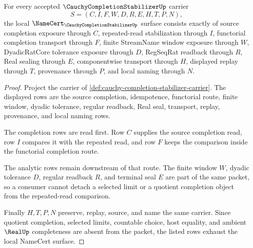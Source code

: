\begin{theorem}
\label{thm:cauchy-completion-stabilizer-namecert-obligations}
For every accepted $\CauchyCompletionStabilizerUp$ carrier
$$
S=(C,I,F,W,D,R,E,H,T,P,N),
$$
the local $\NameCert_{\CauchyCompletionStabilizerUp}$ surface consists exactly of source completion exposure through $C$, repeated-read stabilization through $I$, functorial completion transport through $F$, finite StreamName window exposure through $W$, DyadicRatCore tolerance exposure through $D$, RegSeqRat readback through $R$, Real sealing through $E$, componentwise transport through $H$, displayed replay through $T$, provenance through $P$, and local naming through $N$.
\end{theorem}
\begin{proof}
Project the carrier of \autoref{def:cauchy-completion-stabilizer-carrier}. The displayed rows are the source completion, idempotence, functorial route, finite window, dyadic tolerance, regular readback, Real seal, transport, replay, provenance, and local naming rows.

The completion rows are read first. Row $C$ supplies the source completion read, row $I$ compares it with the repeated read, and row $F$ keeps the comparison inside the functorial completion route.

The analytic rows remain downstream of that route. The finite window $W$, dyadic tolerance $D$, regular readback $R$, and terminal seal $E$ are part of the same packet, so a consumer cannot detach a selected limit or a quotient completion object from the repeated-read comparison.

Finally $H,T,P,N$ preserve, replay, source, and name the same carrier. Since quotient completion, selected limits, countable choice, host equality, and ambient $\RealUp$ completeness are absent from the packet, the listed rows exhaust the local NameCert surface.
\end{proof}

